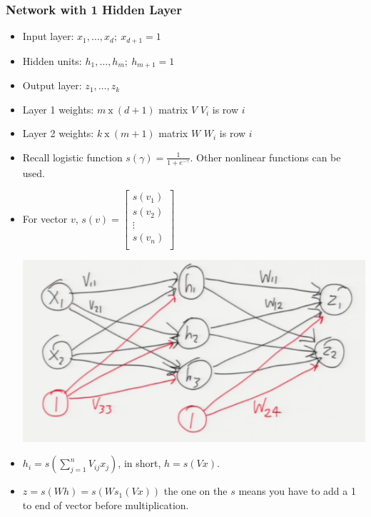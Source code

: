 \documentclass[10pt]{article}
\begin{document}
\subsubsection*{Network with 1 Hidden Layer}
\begin{itemize}
	\item Input layer: $x_{1}, \dots, x_{d}; \ x_{d+1} = 1$
	\item Hidden units: $h_{1}, \dots, h_{m}; \ h_{m+1} = 1$
	\item Output layer: $z_{1}, \dots, z_{k}$
	\item Layer 1 weights: $m \ \text{x} \ (d+1)$ matrix $V$ $V_{i}$ is row $i$
	\item Layer 2 weights: $k \ \text{x} \ (m+1)$ matrix $W$ $W_{i}$ is row $i$
	\item Recall logistic function $s(\gamma) = \frac{1}{1 + e^{-\gamma}}$. Other nonlinear functions can be used.
	\item For vector $v$, $s(v) = \begin{bmatrix}
									s(v_{1})\\
									s(v_{2})\\
									\vdots\\
									s(v_{n})\\
								\end{bmatrix}$
	\begin{center}
		\includegraphics[scale=0.5]{../images/nn}
	\end{center}
	\item $h_{i} = s(\sum_{j=1}^{n} V_{ij}x_{j})$, in short, $h = s(Vx)$.
	\item $z = s(Wh) = s(Ws_{1}(Vx))$ the one on the $s$ means you have to add a 1 to end of vector before multiplication.
\end{itemize}
\end{document}
